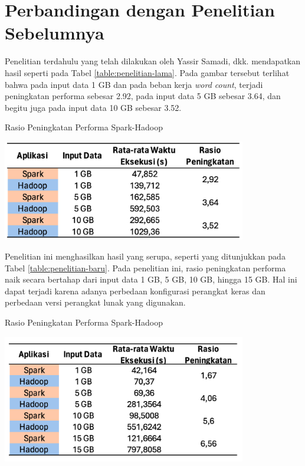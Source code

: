 \section{Perbandingan dengan Penelitian Sebelumnya \cite{samadiPerformanceComparisonHadoop2018}}
Penelitian terdahulu yang telah dilakukan oleh Yassir Samadi, dkk. mendapatkan hasil seperti pada Tabel \ref{table:penelitian-lama}. Pada gambar tersebut terlihat bahwa pada input data 1 GB dan pada beban kerja \textit{word count}, terjadi peningkatan performa sebesar 2.92, pada input data 5 GB sebesar 3.64, dan begitu juga pada input data 10 GB sebesar 3.52.


\begin{table}[h]
  \centering
  \caption{Rasio Peningkatan Performa Spark-Hadoop \cite{samadiPerformanceComparisonHadoop2018}}
  \includegraphics[width=0.8\textwidth]{figures/ch04/0-penelitian-lama-new}
  \label{table:penelitian-lama}
\end{table}

Penelitian ini menghasilkan hasil yang serupa, seperti yang ditunjukkan pada Tabel \ref{table:penelitian-baru}. Pada penelitian ini, rasio peningkatan performa naik secara bertahap dari input data 1 GB, 5 GB, 10 GB, hingga 15 GB. Hal ini dapat terjadi karena adanya perbedaan konfigurasi perangkat keras dan perbedaan versi perangkat lunak yang digunakan.

\begin{table}[h]
  \centering
  \caption{Rasio Peningkatan Performa Spark-Hadoop}
  \includegraphics[width=0.8\textwidth]{figures/ch04/0-penelitian-baru}
  \label{table:penelitian-baru}
\end{table}

